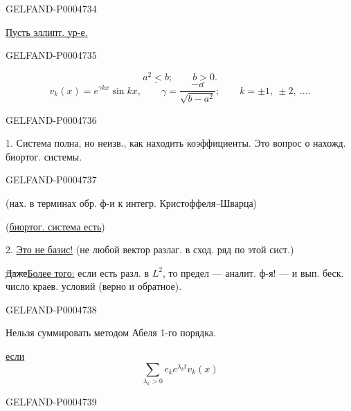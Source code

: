 \begin{GelfandAdjacentEvidence}{GELFAND-P000473}{4}

\uline{Пусть эллипт. ур-е.}
\end{GelfandAdjacentEvidence}
\begin{GelfandAdjacentEvidence}{GELFAND-P000473}{5}


\[
\underline{a^2<b};\qquad\underline{b>0}.
\]
\[
v_k(x)=e^{\gamma kx}\sin kx,\qquad
\gamma=\frac{-a}{\sqrt{b-a^2}};\qquad k=\pm1,\ \pm2,\ \ldots .
\]
\end{GelfandAdjacentEvidence}
\begin{GelfandAdjacentEvidence}{GELFAND-P000473}{6}


1. Система полна, но неизв., как находить коэффициенты.
Это вопрос о нахожд. биортог. системы.
\end{GelfandAdjacentEvidence}
\begin{GelfandAdjacentEvidence}{GELFAND-P000473}{7}

(нах. в терминах обр. ф-и к интегр. Кристоффеля–Шварца)

(\uline{биортог. система есть})

2. \uline{Это не базис!} (не любой вектор разлаг. в сход. ряд по этой сист.)

\sout{Даже}\quad\uline{Более того:} если есть разл. в $L^2$,
то предел — аналит. ф-я! — и вып. беск. число краев. условий (верно и обратное).
\end{GelfandAdjacentEvidence}
\begin{GelfandAdjacentEvidence}{GELFAND-P000473}{8}


Нельзя суммировать методом Абеля 1-го порядка.

\uline{если}
\[
\sum_{\lambda_k>0}e_k e^{\lambda_k t}v_k(x)
\]
\end{GelfandAdjacentEvidence}
\begin{GelfandAdjacentEvidence}{GELFAND-P000473}{9}

\end{GelfandAdjacentEvidence}

